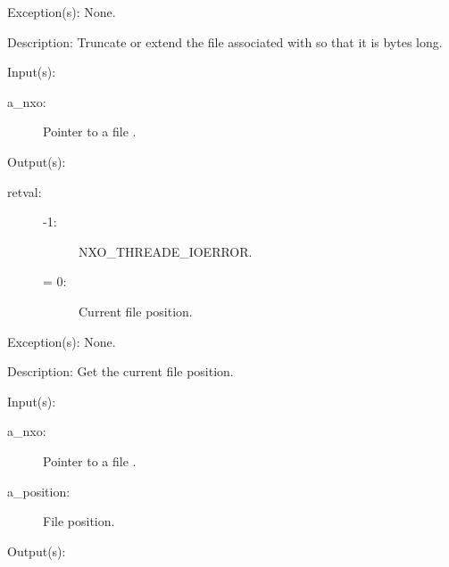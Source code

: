 \begin{capi}
\begin{capilist}
\begin{description}
\begin{description}
			\end{description}
		\end{description}
	\item[Exception(s): ] None.
	\item[Description: ]
		Truncate or extend the file associated with  so
		that it is  bytes long.
	\end{capilist}
\label{nxo_file_position_get}
	\begin{capilist}
	\item[Input(s): ]
		\begin{description}\item[]
		\item[a\_nxo: ]
			Pointer to a file .
		\end{description}
	\item[Output(s): ]
		\begin{description}\item[]
		\item[retval: ]
			\begin{description}\item[]
			\item[-1: ]
				{NXO_THREADE_IOERROR}.
			\item[{\gt}= 0: ]
				Current file position.
			\end{description}\item[]
		\end{description}
	\item[Exception(s): ] None.
	\item[Description: ]
		Get the current file position.
	\end{capilist}
\label{nxo_file_position_set}
	\begin{capilist}
	\item[Input(s): ]
		\begin{description}\item[]
		\item[a\_nxo: ]
			Pointer to a file \classname{nxo}.
		\item[a\_position: ]
			File position.
		\end{description}
	\item[Output(s): ]

\end{capilist}
\end{capi}
